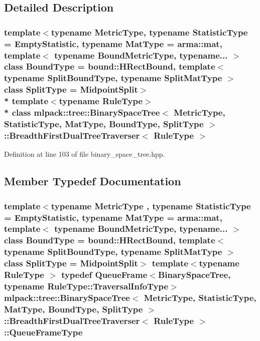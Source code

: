\subsection{Detailed Description}
\subsubsection*{template$<$typename Metric\+Type, typename Statistic\+Type = Empty\+Statistic, typename Mat\+Type = arma\+::mat, template$<$ typename Bound\+Metric\+Type, typename... $>$ class Bound\+Type = bound\+::\+H\+Rect\+Bound, template$<$ typename Split\+Bound\+Type, typename Split\+Mat\+Type $>$ class Split\+Type = Midpoint\+Split$>$\\*
template$<$typename Rule\+Type$>$\\*
class mlpack\+::tree\+::\+Binary\+Space\+Tree$<$ Metric\+Type, Statistic\+Type, Mat\+Type, Bound\+Type, Split\+Type $>$\+::\+Breadth\+First\+Dual\+Tree\+Traverser$<$ Rule\+Type $>$}



Definition at line 103 of file binary\+\_\+space\+\_\+tree.\+hpp.



\subsection{Member Typedef Documentation}
\subsubsection[{Queue\+Frame\+Type}]{\setlength{\rightskip}{0pt plus 5cm}template$<$typename Metric\+Type , typename Statistic\+Type  = Empty\+Statistic, typename Mat\+Type  = arma\+::mat, template$<$ typename Bound\+Metric\+Type, typename... $>$ class Bound\+Type = bound\+::\+H\+Rect\+Bound, template$<$ typename Split\+Bound\+Type, typename Split\+Mat\+Type $>$ class Split\+Type = Midpoint\+Split$>$ template$<$typename Rule\+Type $>$ typedef {\bf Queue\+Frame}$<${\bf Binary\+Space\+Tree}, typename Rule\+Type\+::\+Traversal\+Info\+Type$>$ {\bf mlpack\+::tree\+::\+Binary\+Space\+Tree}$<$ Metric\+Type, Statistic\+Type, Mat\+Type, Bound\+Type, Split\+Type $>$\+::{\bf Breadth\+First\+Dual\+Tree\+Traverser}$<$ Rule\+Type $>$\+::{\bf Queue\+Frame\+Type}}\label{classmlpack_1_1tree_1_1BinarySpaceTree_1_1BreadthFirstDualTreeTraverser_a3883d145979ea63e128b4caea3dd183d}


